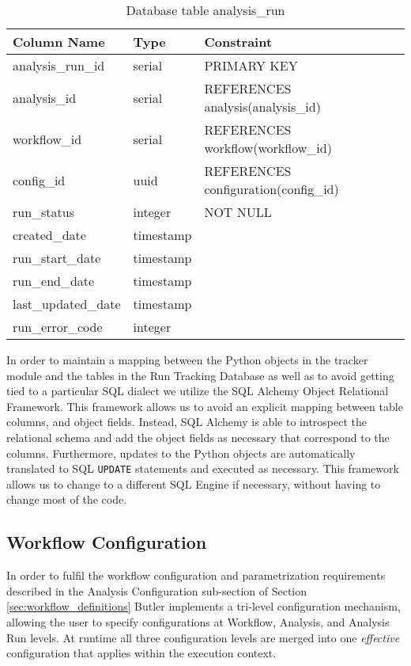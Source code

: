 \begin{table}[h!]
\renewcommand{\arraystretch}{1.2} 
\centering
\begin{tabular}{@{}lll@{}}
\toprule
Column Name & Type & Constraint\\
\midrule
analysis\_run\_id & serial & PRIMARY KEY\\
analysis\_id & serial & REFERENCES analysis(analysis\_id)\\
workflow\_id & serial & REFERENCES workflow(workflow\_id)\\
config\_id & uuid & REFERENCES configuration(config\_id)\\
run\_status & integer & NOT NULL\\
created\_date & timestamp\\
run\_start\_date & timestamp\\
run\_end\_date & timestamp\\
last\_updated\_date & timestamp\\
run\_error\_code & integer\\
\bottomrule
\end{tabular}
\caption{Database table analysis\_run}
\label{tab:analysis_run_table}
\end{table}

In order to maintain a mapping between the Python objects in the tracker module and the tables in the Run Tracking Database as well as to avoid getting tied to a particular SQL dialect we utilize the SQL Alchemy Object Relational Framework. This framework allows us to avoid an explicit mapping between table columns, and object fields. Instead, SQL Alchemy is able to introspect the relational schema and add the object fields as necessary that correspond to the columns. Furthermore, updates to the Python objects are automatically translated to SQL \texttt{UPDATE} statements and executed as necessary. This framework allows us to change to a different SQL Engine if necessary, without having to change most of the code.

\subsection{Workflow Configuration} 
\label{sec:workflow_configuration_design}

In order to fulfil the workflow configuration and parametrization requirements described in the Analysis Configuration sub-section of Section \ref{sec:workflow_definitions} Butler implements a tri-level configuration mechanism, allowing the user to specify configurations at Workflow, Analysis, and Analysis Run levels. At runtime all three configuration levels are merged into one \emph{effective} configuration that applies within the execution context.

